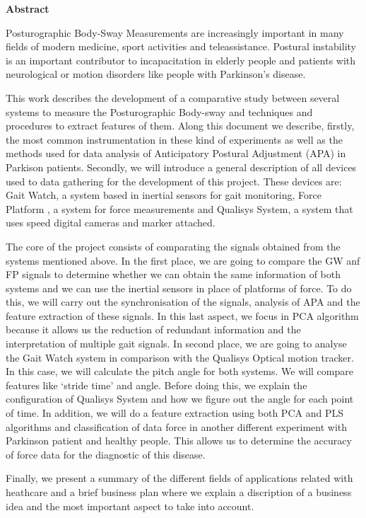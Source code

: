 \begin{titlepage}
\label{ch:abstract}
{ \huge \bfseries Abstract \\[0.4cm] }

Posturographic Body-Sway Measurements are increasingly important in many fields of modern medicine, sport activities and teleassistance.  Postural instability is an important contributor to incapacitation in elderly people and patients with neurological or motion disorders like people with Parkinson’s disease.

This work describes the development  of a comparative study between several systems to measure the Posturographic Body-sway and techniques and procedures to extract features of them. Along this document we describe, firstly, the most common  instrumentation in these kind of experiments as well as the methods  used for data analysis of Anticipatory Postural Adjustment (APA) in Parkison patients. Secondly, we will introduce a general description of all devices used to data gathering  for the development of  this project. These devices are: Gait Watch, a system based in inertial sensors for gait monitoring, Force Platform , a system for force measurements and Qualisys System, a system that uses speed digital cameras and marker attached.

The core of the project consists of comparating the signals obtained from the systems mentioned above. In the first place, we are going to compare the GW anf FP signals to determine whether we can obtain the same information of both systems and we can use the inertial sensors in place of platforms of force. To do this, we will carry out the synchronisation of the signals, analysis of APA and the feature extraction of these signals. In this last aspect, we focus in PCA algorithm because it allows us the reduction of redundant information and the interpretation of multiple gait signals. In second place, we are going to analyse the Gait Watch system in comparison with the Qualisys Optical motion tracker. In this case, we will calculate the pitch angle for both systems. We will compare features like ‘stride time’ and angle. Before doing this, we explain  the configuration of Qualisys System and how we figure out the angle for each point of time. In addition, we will do a feature extraction using both PCA and PLS algorithms and classification of data force in another different experiment with Parkinson patient and healthy people. This allows us to determine the accuracy of force data for the diagnostic of this disease.

Finally, we present a summary of the different fields of applications related with heathcare and a brief  business plan where we explain a discription of a business idea and the most important aspect to take into account.

\end{titlepage} 